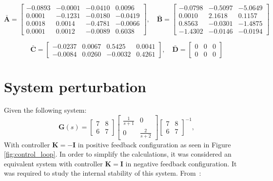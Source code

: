 \documentclass{scrreprt}
\begin{document}
\begin{equation}
    \label{eq:A, B minreal}
    \bar{\boldsymbol{A}} = 
    \begin{bmatrix}
        -0.0893 & -0.0001 & -0.0410 & 0.0096\\
         0.0001 & -0.1231 &  -0.0180 & -0.0419 \\
         0.0018 & 0.0014 & -0.4781 & -0.0066\\
         0.0001 &  0.0012 & -0.0089 & 0.6038 
    \end{bmatrix}, \quad
    \bar{\boldsymbol{B}} = 
    \begin{bmatrix}
        -0.0798 &  -0.5097 & -5.0649 \\
        0.0010 & 2.1618 & 0.1157 \\
        0.8563 &  -0.0301 & -1.4875 \\
        -1.4302 & -0.0146 & -0.0194
    \end{bmatrix}
\end{equation}

\begin{equation}
    \label{eq:C, D minreal}
    \bar{\boldsymbol{C}} = 
    \begin{bmatrix}
        -0.0237 & 0.0067 &  0.5425 & 0.0041 \\
         -0.0084 & 0.0260 & -0.0032 & 0.4261
    \end{bmatrix}, \quad
    \bar{\boldsymbol{D}} = 
    \begin{bmatrix}
        0 & 0 & 0 \\
        0 & 0 & 0
    \end{bmatrix}
\end{equation}


\section{System perturbation}
Given the following system:
\begin{equation}
    \boldsymbol{G}(s) = \begin{bmatrix} 7 & 8 \\ 6 & 7 \end{bmatrix} \begin{bmatrix} \frac{1}{s+1} & 0 \\ 0 & \frac{2}{s+2} \end{bmatrix} \begin{bmatrix} 7 & 8 \\ 6 & 7 \end{bmatrix}^{-1},
\end{equation}
With controller $\boldsymbol{K}=-\boldsymbol{I}$ in positive feedback configuration as seen in Figure \ref{fig:control_loop}.
In order to simplify the calculations, it was considered an equivalent system with controller $\boldsymbol{K}=\boldsymbol{I}$ in negative feedback configuration.
It was required to study the internal stability of this system. From~\cite{LectureNotes_6}:
\end{document}
